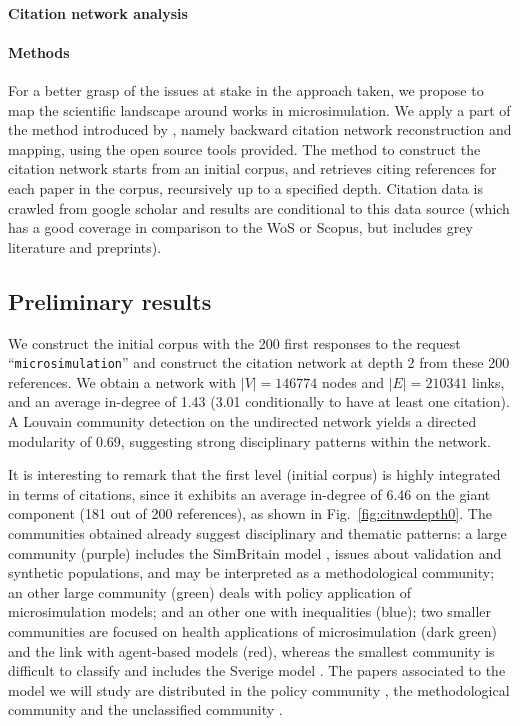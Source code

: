 \paragraph{Citation network analysis}


\paragraph{Methods}

For a better grasp of the issues at stake in the approach taken, we propose to map the scientific landscape around works in microsimulation. We apply a part of the method introduced by \cite{raimbault2017exploration}, namely backward citation network reconstruction and mapping, using the open source tools provided. The method to construct the citation network starts from an initial corpus, and retrieves citing references for each paper in the corpus, recursively up to a specified depth. Citation data is crawled from google scholar and results are conditional to this data source (which has a good coverage in comparison to the WoS or Scopus, but includes grey literature and preprints).




\subsection{Preliminary results}

We construct the initial corpus with the 200 first responses to the request ``\texttt{microsimulation}'' and construct the citation network at depth 2 from these 200 references. We obtain a network with $\left|V\right|=146774$ nodes and $\left|E\right|=210341$ links, and an average in-degree of 1.43 (3.01 conditionally to have at least one citation). A Louvain community detection on the undirected network yields a directed modularity of 0.69, suggesting strong disciplinary patterns within the network.  

It is interesting to remark that the first level (initial corpus) is highly integrated in terms of citations, since it exhibits an average in-degree of 6.46 on the giant component (181 out of 200 references), as shown in Fig.~\ref{fig:citnwdepth0}. The communities obtained already suggest disciplinary and thematic patterns: a large community (purple) includes the SimBritain model \cite{ballas2005simbritain}, issues about validation and synthetic populations, and may be interpreted as a methodological community; an other large community (green) deals with policy application of microsimulation models; and an other one with inequalities (blue); two smaller communities are focused on health applications of microsimulation (dark green) and the link with agent-based models (red), whereas the smallest community is difficult to classify and includes the Sverige model \cite{holm2002sverige}. The papers associated to the model we will study are distributed in the policy community \cite{wu2012moses}, the methodological community \cite{townend2009moses} and the unclassified community \cite{rees2017moses}.

